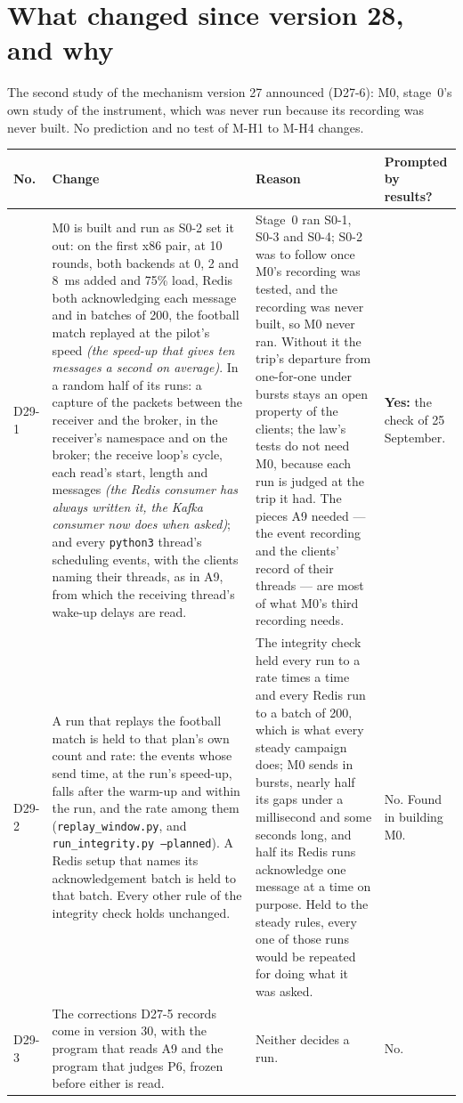 \documentclass[11pt]{article}
\newcommand{\gl}[1]{{\color{soft}\itshape\small (#1)}}
\begin{document}
\section*{What changed since version 28, and why}
The second study of the mechanism version 27 announced (D27-6): M0, stage~0's own study of the
instrument, which was never run because its recording was never built. No prediction and no
test of M-H1 to M-H4 changes.

{\small
\begin{longtable}{@{}p{1.1cm} >{\raggedright\arraybackslash}p{6.1cm} >{\raggedright\arraybackslash}p{6.0cm} >{\raggedright\arraybackslash}p{2.2cm}@{}}
\toprule
\textbf{No.} & \textbf{Change} & \textbf{Reason} & \textbf{Prompted by results?} \\
\midrule
\endhead
D29-1 & M0 is built and run as S0-2 set it out: on the first x86 pair, at 10 rounds, both backends at 0, 2 and 8~ms added and 75\% load, Redis both acknowledging each message and in batches of 200, the football match replayed at the pilot's speed \gl{the speed-up that gives ten messages a second on average}. In a random half of its runs: a capture of the packets between the receiver and the broker, in the receiver's namespace and on the broker; the receive loop's cycle, each read's start, length and messages \gl{the Redis consumer has always written it, the Kafka consumer now does when asked}; and every \texttt{python3} thread's scheduling events, with the clients naming their threads, as in A9, from which the receiving thread's wake-up delays are read. & Stage~0 ran S0-1, S0-3 and S0-4; S0-2 was to follow once M0's recording was tested, and the recording was never built, so M0 never ran. Without it the trip's departure from one-for-one under bursts stays an open property of the clients; the law's tests do not need M0, because each run is judged at the trip it had. The pieces A9 needed --- the event recording and the clients' record of their threads --- are most of what M0's third recording needs. & \textbf{Yes:} the check of 25 September. \\
D29-2 & A run that replays the football match is held to that plan's own count and rate: the events whose send time, at the run's speed-up, falls after the warm-up and within the run, and the rate among them (\texttt{replay\_window.py}, and \texttt{run\_integrity.py --planned}). A Redis setup that names its acknowledgement batch is held to that batch. Every other rule of the integrity check holds unchanged. & The integrity check held every run to a rate times a time and every Redis run to a batch of 200, which is what every steady campaign does; M0 sends in bursts, nearly half its gaps under a millisecond and some seconds long, and half its Redis runs acknowledge one message at a time on purpose. Held to the steady rules, every one of those runs would be repeated for doing what it was asked. & No. Found in building M0. \\
D29-3 & The corrections D27-5 records come in version 30, with the program that reads A9 and the program that judges P6, frozen before either is read. & Neither decides a run. & No. \\
\bottomrule
\end{longtable}}
\end{document}
